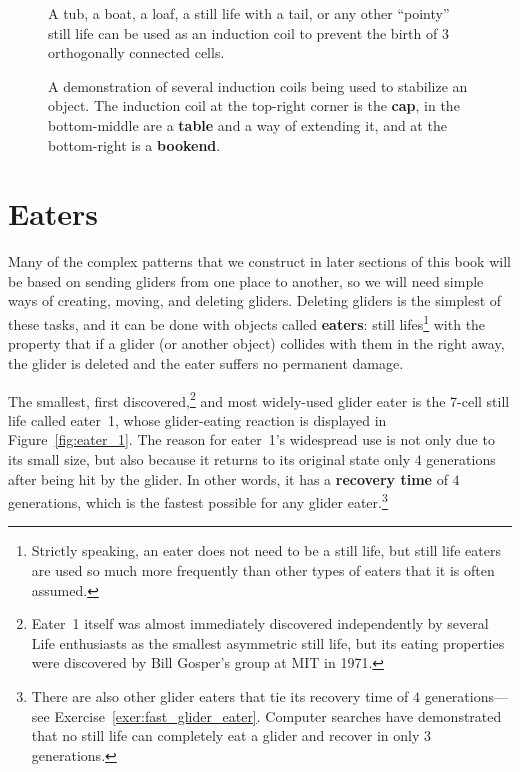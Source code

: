 \begin{figure}[!htb]
	\centering
	\begin{minipage}{.31\textwidth}
		\centering
		\caption{A tub, a boat, a loaf, a still life with a tail, or any other ``pointy'' still life can be used as an induction coil to prevent the birth of $3$ orthogonally connected cells.}
		\label{fig:5_cell_induction}
	\end{minipage} \quad %
	\begin{minipage}{.64\textwidth}
		\centering
		\caption{A demonstration of several induction coils being used to stabilize an object. The induction coil at the top-right corner is the \textbf{cap}, in the bottom-middle are a \textbf{table} and a way of extending it, and at the bottom-right is a \textbf{bookend}.}
		\label{fig:induction_coil_examples}
	\end{minipage}
\end{figure}


\section{Eaters}\label{sec:eaters}

Many of the complex patterns that we construct in later sections of this book will be based on sending gliders from one place to another, so we will need simple ways of creating, moving, and deleting gliders. Deleting gliders is the simplest of these tasks, and it can be done with objects called \textbf{eaters}: still lifes\footnote{Strictly speaking, an eater does not need to be a still life, but still life eaters are used so much more frequently than other types of eaters that it is often assumed.} with the property that if a glider (or another object) collides with them in the right away, the glider is deleted and the eater suffers no permanent damage.

The smallest, first discovered,\footnote{Eater~1 itself was almost immediately discovered independently by several Life enthusiasts as the smallest asymmetric still life, but its eating properties were discovered by Bill Gosper's group at MIT in 1971.} and most widely-used glider eater is the 7-cell still life called eater~1, whose glider-eating reaction is displayed in Figure~\ref{fig:eater_1}. The reason for eater~1's widespread use is not only due to its small size, but also because it returns to its original state only $4$ generations after being hit by the glider. In other words, it has a \textbf{recovery time} of $4$ generations, which is the fastest possible for any glider eater.\footnote{There are also other glider eaters that tie its recovery time of $4$ generations---see Exercise~\ref{exer:fast_glider_eater}. Computer searches have demonstrated that no still life can completely eat a glider and recover in only $3$ generations.}

